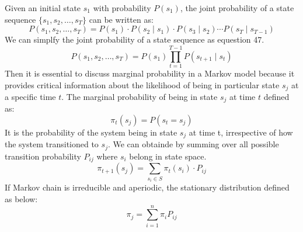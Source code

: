 \documentclass[12pt,a4paper]{article}
\begin{document}
Given an initial state \( s_1 \) with probability \( P(s_1) \), the joint probability of a state sequence \( \{s_1, s_2, \dots, s_T\} \) can be written as:
\begin{equation}
    P(s_1, s_2, \dots, s_T) = P(s_1) \cdot P(s_2 \mid s_1) \cdot P(s_3 \mid s_2) \cdots P(s_T \mid s_{T-1})
\end{equation}
We can simplfy the joint probability of a state sequence as equestion 47.
\begin{equation}
    P(s_1, s_2, \dots, s_T) = P(s_1) \prod_{t=1}^{T-1} P(s_{t+1} \mid s_{t})
\end{equation}
Then it is essential to discuss marginal probability in a Markov model because it provides critical information about the likelihood of being in particular state $s_j$ at a specific time $t$. The marginal probability of being in state $s_j$ at time $t$ defined as:
\begin{equation}
    \pi_t(s_j) = P(s_t=s_j)
\end{equation}
It is the probability of the system being in state $s_j$ at time t, irrespective of how the system transitioned to $s_j$. We can obtainde by summing over all possible transition probability $P_{ij}$ where $s_i$ belong in state space. 
\begin{equation}
    \pi_{t+1}(s_j) = \sum_{s_i \in S} \pi_t(s_i) \cdot P_{ij}
\end{equation}
If Markov chain is irreducible and aperiodic, the stationary distribution defined as below:
\begin{equation}
    \pi_j = \sum_{i=1}^{n} \pi_i P_{ij}
\end{equation}
\end{document}
